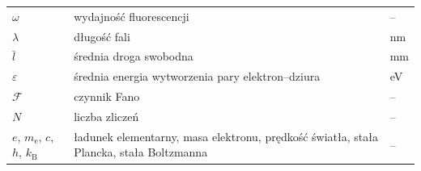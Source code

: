 \begin{tabular}{@{}lp{}l@{}}
$\omega$                & wydajność fluorescencji & -- \\
$\lambda$               & długość fali & nm \\
$\bar l$                & średnia droga swobodna & mm \\
$\varepsilon$           & średnia energia wytworzenia pary elektron--dziura & eV \\
$\mathcal F$            & czynnik Fano & -- \\
$N$                     & liczba zliczeń & -- \\
$e$, $m_\mathrm{e}$, $c$, $h$, $k_\mathrm{B}$ & ładunek elementarny, masa elektronu, prędkość światła, stała Plancka, stała Boltzmanna & -- \\
\bottomrule
\end{tabular}
